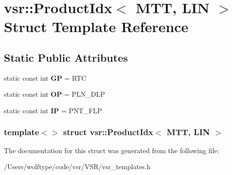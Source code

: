 \hypertarget{structvsr_1_1_product_idx_3_01_m_t_t_00_01_l_i_n_01_4}{\section{vsr\-:\-:Product\-Idx$<$ M\-T\-T, L\-I\-N $>$ Struct Template Reference}
\label{structvsr_1_1_product_idx_3_01_m_t_t_00_01_l_i_n_01_4}
}
\subsection*{Static Public Attributes}
\begin{DoxyCompactItemize}
\item 
\hypertarget{structvsr_1_1_product_idx_3_01_m_t_t_00_01_l_i_n_01_4_adbaaff1ea7df9981e87275aeedb02c4b}{static const int {\bfseries G\-P} = R\-T\-C}\label{structvsr_1_1_product_idx_3_01_m_t_t_00_01_l_i_n_01_4_adbaaff1ea7df9981e87275aeedb02c4b}

\item 
\hypertarget{structvsr_1_1_product_idx_3_01_m_t_t_00_01_l_i_n_01_4_a121ef31804e04519c4b81dbfdcdc2c77}{static const int {\bfseries O\-P} = P\-L\-N\-\_\-\-D\-L\-P}\label{structvsr_1_1_product_idx_3_01_m_t_t_00_01_l_i_n_01_4_a121ef31804e04519c4b81dbfdcdc2c77}

\item 
\hypertarget{structvsr_1_1_product_idx_3_01_m_t_t_00_01_l_i_n_01_4_aeb9d1379a39c8b9dfd103382fdfe4110}{static const int {\bfseries I\-P} = P\-N\-T\-\_\-\-F\-L\-P}\label{structvsr_1_1_product_idx_3_01_m_t_t_00_01_l_i_n_01_4_aeb9d1379a39c8b9dfd103382fdfe4110}

\end{DoxyCompactItemize}
\subsubsection*{template$<$$>$ struct vsr\-::\-Product\-Idx$<$ M\-T\-T, L\-I\-N $>$}



The documentation for this struct was generated from the following file\-:\begin{DoxyCompactItemize}
\item 
/\-Users/wolftype/code/vsr/\-V\-S\-R/vsr\-\_\-templates.\-h\end{DoxyCompactItemize}
